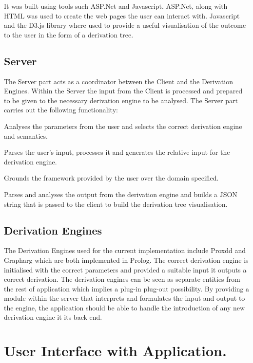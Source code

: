 It was built using tools such ASP.Net and Javascript. ASP.Net, along with HTML was used to create the web pages the user can interact with. Javascript and the D3.js library where used to provide a useful visualisation of the outcome to the user in the form of a derivation tree.

\subsection{Server}

The Server part acts as a coordinator between the Client and the Derivation Engines. Within the Server the input from the Client is processed and prepared to be given to the necessary derivation engine to be analysed. The Server part carries out the following functionality:

\begin{itemize*}
\item Analyses the parameters from the user and selects the correct derivation engine and semantics.
\item Parses the user's input, processes it and generates the relative input for the derivation engine.
\item Grounds the framework provided by the user over the domain specified.
\item Parses and analyses the output from the derivation engine and builds a JSON string that is passed to the client to build the derivation tree visualisation.
\end{itemize*}

\subsection{Derivation Engines}

The Derivation Engines used for the current implementation include Proxdd and Grapharg which are both implemented in Prolog. The correct derivation engine is initialised with the correct parameters and provided a suitable input it outputs a correct derivation. The derivation engines can be seen as separate entities from the rest of application which implies a plug-in plug-out possibility. By providing a module within the server that interprets and formulates the input and output to the engine, the application should be able to handle the introduction of any new derivation engine it its back end.

\section{User Interface with Application.}

